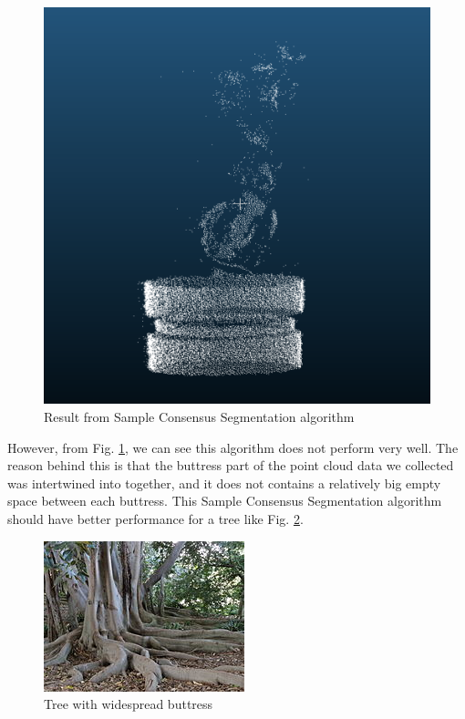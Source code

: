 \documentclass[runningheads,a4paper]{llncs}
\begin{document}
\begin{figure}
\centering
\includegraphics[scale=0.3]{cylinder-extraction-result.png}
\caption{Result from Sample Consensus Segmentation algorithm}
\label{fig:cylinder-extraction-result}
\end{figure}

However, from Fig. \ref{fig:cylinder-extraction-result},  we can see this algorithm does not perform very well. The reason behind this is that the buttress part of the point cloud data we collected was intertwined into together, and it does not contains a relatively big empty space between each buttress. This Sample Consensus Segmentation algorithm should have better performance for a tree like Fig. \ref{fig:widespread-buttress}.

\begin{figure}
\centering
\includegraphics[scale=.5]{Buttress_roots.JPG}
\caption{Tree with widespread buttress }
\label{fig:widespread-buttress}
\end{figure}
\end{document}
